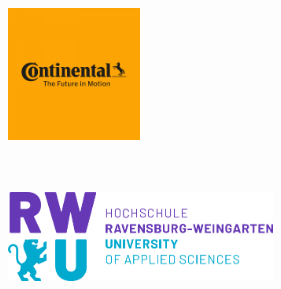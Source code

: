 \documentclass[a4paper,12pt,singlespacing]{article}
\begin{document}
\setlength{\parindent}{0ex}

\begin{titlepage}
	
	
	\begin{minipage}{0.4\textwidth}
		\begin{flushleft} \large
			\includegraphics[width=3.5cm]{./Images/conti_logo.png} %
		\end{flushleft}
	\end{minipage}
	~
	\begin{minipage}{0.5\textwidth}
		\begin{flushright} \large
			\includegraphics[width=7cm]{./Images/logo.png} %
		\end{flushright}
	\end{minipage}\\[1.5cm]
	
	
	\newcommand{\HRule}{\rule{\linewidth}{0.5mm}} %
	
	\center %
	
	

\end{titlepage}
\end{document}
